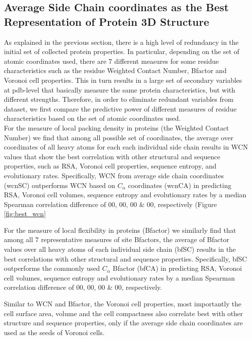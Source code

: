 \documentclass[11pt]{article}
\begin{document}
    \subsection*{Average Side Chain coordinates as the Best Representation of Protein 3D Structure}

        As explained in the previous section, there is a high level of redundancy in the initial set of collected protein properties. In particular, depending on the set of atomic coordinates used, there are $7$ different measures for some residue characteristics such as the residue Weighted Contact Number, Bfactor and Voronoi cell properties. This in turn results in a large set of secondary variables at pdb-level that basically measure the same protein characteristics, but with different strengths.  Therefore, in order to eliminate redundant variables from dataset, we first compare the predictive power of different measures of residue characteristics based on the set of atomic coordinates used.
        \\

        For the measure of local packing density in proteins (the Weighted Contact Number) we find that among all possible set of coordinates, the average over coordinates of all heavy atoms for each each individual side chain results in WCN values that show the best correlation with other structural and sequence properties, such as RSA, Voronoi cell properties, sequence entropy, and evolutionary rates. Specifically, WCN from average side chain coordinates (wcnSC) outperforms WCN based on $C_\alpha$ coordinates (wcnCA) in predicting RSA, Voronoi cell volumes, sequence entropy and evolutionary rates by a median Spearman correlation difference of $00$, $00$, $00$ \& $00$, respectively (Figure \ref{fig:best_wcn}

        For the measure of local flexibility in proteins (Bfactor) we similarly find that among all $7$ representative measures of site Bfactors, the average of Bfactor values over all heavy atoms of each individual side chain (bfSC) results in the best correlations with other structural and sequence properties. Specifically, bfSC outperforms the commonly used $C_\alpha$ Bfactor (bfCA) in predicting RSA, Voronoi cell volumes, sequence entropy and evolutionary rates by a median Spearman correlation difference of $00$, $00$, $00$ \& $00$, respectively.

        Similar to WCN and Bfactor, the Voronoi cell properties, most importantly the cell surface area, volume and the cell compactness also correlate best with other structure and sequence properties, only if the average side chain coordinates are used as the seeds of Voronoi cells.
\end{document}
